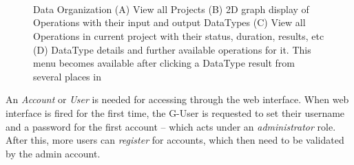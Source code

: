  \begin{figure}[!htbp]

		\centering
		\\
		\\
		\\
		\caption{\TVB Data Organization
		(A) View all Projects
		(B) 2D graph display of Operations with their input and output DataTypes 
		(C) View all Operations in current project with their status, duration, results, etc
		(D) DataType details and further available operations for it. This menu becomes available after clicking a DataType result from several places in \TVB }
				\label{fig:project}
\end{figure}

		An \emph{Account} or \emph{User} is needed for accessing \TVB through
		the web interface.  When \TVB web interface is fired for the first
		time, the G-User is requested to set their username and a
		password for the first account -- which acts under an
		\emph{administrator} role. After this, more users can \emph{register}
		for accounts, which then need to be validated by the admin
		account.

